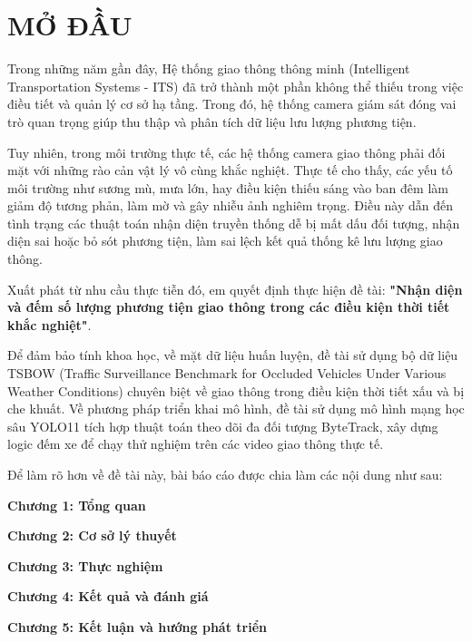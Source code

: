 
\chapter*{MỞ ĐẦU} %

\label{Chapter0} %


Trong những năm gần đây, Hệ thống giao thông thông minh (Intelligent Transportation Systems - ITS) đã trở thành một phần không thể thiếu trong việc điều tiết và quản lý cơ sở hạ tầng. Trong đó, hệ thống camera giám sát đóng vai trò quan trọng giúp thu thập và phân tích dữ liệu lưu lượng phương tiện.

Tuy nhiên, trong môi trường thực tế, các hệ thống camera giao thông phải đối mặt với những rào cản vật lý vô cùng khắc nghiệt. Thực tế cho thấy, các yếu tố môi trường như sương mù, mưa lớn, hay điều kiện thiếu sáng vào ban đêm làm giảm độ tương phản, làm mờ và gây nhiễu ảnh nghiêm trọng. Điều này dẫn đến tình trạng các thuật toán nhận diện truyền thống dễ bị mất dấu đối tượng, nhận diện sai hoặc bỏ sót phương tiện, làm sai lệch kết quả thống kê lưu lượng giao thông.

Xuất phát từ nhu cầu thực tiễn đó, em quyết định thực hiện đề tài: \textbf{"Nhận diện và đếm số lượng phương tiện giao thông trong các điều kiện thời tiết khắc nghiệt"}.

Để đảm bảo tính khoa học, về mặt dữ liệu huấn luyện, đề tài sử dụng bộ dữ liệu TSBOW (Traffic Surveillance Benchmark for Occluded Vehicles Under Various Weather Conditions) chuyên biệt về giao thông trong điều kiện thời tiết xấu và bị che khuất. Về phương pháp triển khai mô hình, đề tài sử dụng mô hình mạng học sâu YOLO11 tích hợp thuật toán theo dõi đa đối tượng ByteTrack, xây dựng logic đếm xe để chạy thử nghiệm trên các video giao thông thực tế.

Để làm rõ hơn về đề tài này, bài báo cáo được chia làm các nội dung như sau:

\textbf{Chương 1: Tổng quan}

\textbf{Chương 2: Cơ sở lý thuyết}

\textbf{Chương 3: Thực nghiệm}

\textbf{Chương 4: Kết quả và đánh giá}

\textbf{Chương 5: Kết luận và hướng phát triển}
